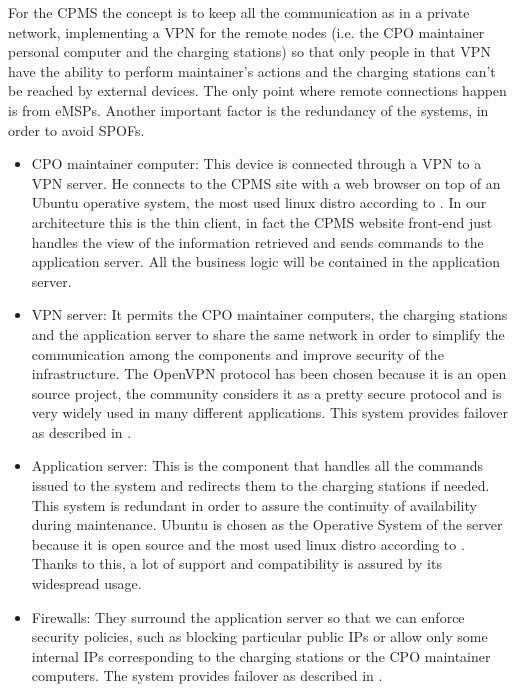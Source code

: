 For the \ac{CPMS} the concept is to keep all the communication as in a private network, implementing a \ac{VPN} for the remote nodes (i.e. the \ac{CPO} maintainer personal computer and the charging stations) so that only people in that \ac{VPN} have the ability to perform maintainer's actions and the charging stations can't be reached by external devices. The only point where remote connections happen is from \acp{eMSP}. 
Another important factor is the redundancy of the systems, in order to avoid \acp{SPOF}.
\begin{itemize}
    \item \ac{CPO} maintainer computer: This device is connected through a \ac{VPN} to a \ac{VPN} server. He connects to the \ac{CPMS} site with a web browser on top of an Ubuntu operative system, the most used linux distro according to \cite{ref:most-popular-linux-distro}.
    In our architecture this is the thin client, in fact the \ac{CPMS} website front-end just handles the view of the information retrieved and sends commands to the application server. All the business logic will be contained in the application server.
    \item \ac{VPN} server: It permits the \ac{CPO} maintainer computers, the charging stations and the application server to share the same network in order to simplify the communication among the components and improve security of the infrastructure.
    The OpenVPN protocol \cite{ref:openvpn-site} has been chosen because it is an open source project, the community considers it as a pretty secure protocol and is very widely used in many different applications. 
    This system provides failover as described in \cite{ref:redundant-VPN-servers}.
    \item Application server: This is the component that handles all the commands issued to the system and redirects them to the charging stations if needed. This system is redundant in order to assure the continuity of availability during maintenance. 
    Ubuntu is chosen as the Operative System of the server because it is open source and the most used linux distro according to \cite{ref:most-popular-linux-distro}. Thanks to this, a lot of support and compatibility is assured by its widespread usage.
    \item Firewalls: They surround the application server so that we can enforce security policies, such as blocking particular public IPs or allow only some internal IPs corresponding to the charging stations or the \ac{CPO} maintainer computers. The system provides failover as described in \cite{ref:redundant-firewalls}.
\end{itemize}
\clearpage

